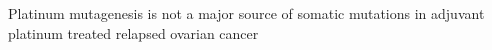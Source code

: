 Platinum mutagenesis is not a major source of somatic mutations in adjuvant platinum treated relapsed ovarian cancer